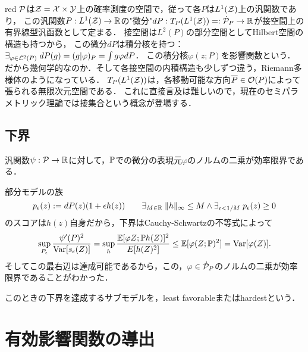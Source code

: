 \documentclass[uplatex,dvipdfmx]{jsreport}
\begin{document}
\begin{tbox}{red}{}
    $\P$は$\cZ=\X\times\Y$上の確率測度の空間で，従って各$P$は$L^1(\cZ)$上の汎関数であり，
    この汎関数$P:L^1(\cZ)\to\R$の"微分"$dP:T_P(L^1(\cZ))=:\dot{\P}_P\to\R$が接空間上の有界線型汎函数として定まる．
    接空間は$L^2(P)$の部分空間としてHilbert空間の構造も持つから，
    この微分$dP$は積分核を持つ：$\exists_{\varphi\in\L^2(P)}\;dP(g)=(g|\varphi)_P=\int g\varphi dP$．
    この積分核$\varphi(z;P)$を影響関数という．
    だから幾何学的なのか．そして各接空間の内積構造も少しずつ違う，Riemann多様体のようになっている．
    $T_P(L^1(\cZ))$は，各移動可能な方向$\o{P}\in\O(P)$によって張られる無限次元空間である．
    これに直接言及は難しいので，現在のセミパラメトリック理論では接集合という概念が登場する．
\end{tbox}

\subsection{下界}

\begin{tcolorbox}[colframe=ForestGreen, colback=ForestGreen!10!white,breakable,colbacktitle=ForestGreen!40!white,coltitle=black,fonttitle=\bfseries\sffamily,
title=]
    汎関数$\psi:\P\to\R$に対して，$\bP$での微分の表現元$\varphi$のノルムの二乗が効率限界である．
\end{tcolorbox}

\begin{discussion}
    部分モデルの族
    \[p_\ep(z):=dP(z)(1+\ep h(z))\qquad \exists_{M\in\R}\;\norm{h}_\infty\le M\land\exists_{\ep<1/M}\;p_\ep(z)\ge0\]
    のスコアは$h(z)$自身だから，下界はCauchy-Schwartzの不等式によって
    \[\sup_{P_\ep}\frac{\psi'(P)^2}{\Var[s_\ep(Z)]}=\sup_{h}\frac{\bE[\varphi{Z;\bP}h(Z)]^2}{E[h(Z)^2]}\le\bE[\varphi(Z;\bP)^2]=\Var[\varphi(Z)].\]
    そしてこの最右辺は達成可能であるから，この，$\varphi\in\dot{\P}_P$のノルムの二乗が効率限界であることがわかった．
\end{discussion}
\begin{remark}
    このときの下界を達成するサブモデルを，least favorableまたはhardestという\cite{Asymptotic Statistics}．
\end{remark}

\begin{corollary}
    
\end{corollary}

\section{有効影響関数の導出}
\end{document}
